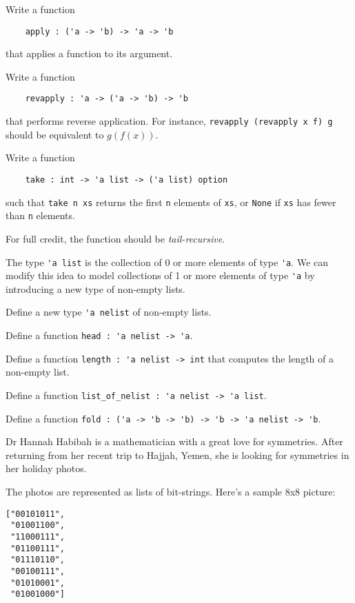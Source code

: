 \documentclass[arhiv]{../izpit}
\begin{document}

\naloga[]

\podnaloga
Write a function
\begin{verbatim}
    apply : ('a -> 'b) -> 'a -> 'b
\end{verbatim}
that applies a function to its argument.

\podnaloga
Write a function
\begin{verbatim}
    revapply : 'a -> ('a -> 'b) -> 'b
\end{verbatim}
that performs reverse application. For instance, \verb|revapply (revapply x f) g| should be equivalent to $g (f (x))$.

\podnaloga
Write a function
\begin{verbatim}
    take : int -> 'a list -> ('a list) option
\end{verbatim}
such that \verb|take n xs| returns the first \verb|n| elements of \verb|xs|, or \verb|None| if \verb|xs| has fewer than \verb|n| elements.

For full credit, the function should be \emph{tail-recursive}.

\naloga[]
The type \verb|'a list| is the collection of 0 or more elements of type \verb|'a|. We can modify this idea to model collections of 1 or more elements of type \verb|'a| by introducing a new type of non-empty lists.

\podnaloga
Define a new type \verb|'a nelist| of non-empty lists.

\podnaloga
Define a function \verb|head : 'a nelist -> 'a|.

\podnaloga
Define a function \verb|length : 'a nelist -> int| that computes the length of a non-empty list.

\podnaloga
Define a function \verb|list_of_nelist : 'a nelist -> 'a list|.

\podnaloga
Define a function \verb|fold : ('a -> 'b -> 'b) -> 'b -> 'a nelist -> 'b|.

\naloga[]
Dr Hannah Habibah is a mathematician with a great love for symmetries. After returning from her recent trip to Hajjah, Yemen, she is looking for symmetries in her holiday photos.

The photos are represented as lists of bit-strings. Here's a sample 8x8 picture:
\begin{verbatim}
["00101011",
 "01001100",
 "11000111",
 "01100111",
 "01110110",
 "00100111",
 "01010001",
 "01001000"]
\end{verbatim}
\end{document}
